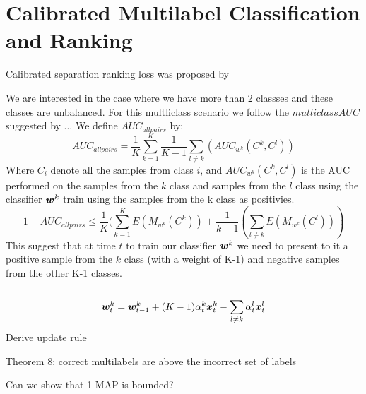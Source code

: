 \section{Calibrated Multilabel Classification and Ranking}

Calibrated separation ranking loss was proposed by \cite{GuoShuurmans11}

We are interested in the case where we have more than 2 classses and these classes are unbalanced. For this multliclass scenario we follow the $mutliclass AUC$ suggested by ... 
We define $AUC_{all pairs}$ by:
\[
	AUC_{all pairs} = \frac{1}{K} \sum\limits_{k=1}^{K}  \frac{1}{K-1}\sum\limits_{l \neq k} (AUC_{w^k}(C^k, C^l)) 
\]
Where $C_i$ denote all the samples from class $i$, and $AUC_{w^k}(C^k, C^l)$ is the AUC performed on the samples from the $k$ class and samples from the $l$ class using the classifier $ \bm{w}^k $ train using the samples from the k class as positivies.
\[
1 - AUC_{all pairs} \leq \frac{1}{K} ( \sum\limits_{k=1}^{K} E(M_{w^k}(C^k)) + \frac{1}{k-1} ( \sum\limits_{l \neq k}  E(M_{w^k}(C^l)) )
\]
This suggest that at time $t$ to train our classifier $\bm{w}^k $ we need to present to it a positive sample from the $k$ class (with a weight of K-1) and negative samples from the other K-1 classes.\\
\\
\[
  \bm{w}^k_t = \bm{w}^k_{t-1} + (K-1)\alpha^k_t \bm{x}^k_t - \sum\limits_{l \neq k} \alpha^l_t \bm{x}^l_t
\]
Derive update rule

Theorem 8: correct multilabels are above the incorrect set of labels

Can we show that 1-MAP is bounded?
